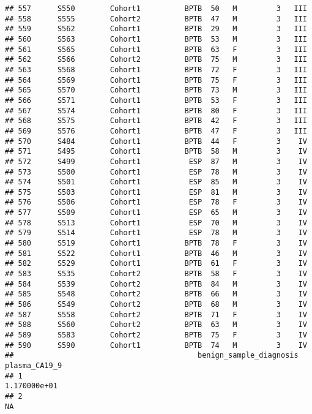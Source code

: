 \documentclass[
]{article}
\begin{document}
\begin{verbatim}
## 557      S550        Cohort1          BPTB  50   M         3   III
## 558      S555        Cohort2          BPTB  47   M         3   III
## 559      S562        Cohort1          BPTB  29   M         3   III
## 560      S563        Cohort1          BPTB  53   M         3   III
## 561      S565        Cohort1          BPTB  63   F         3   III
## 562      S566        Cohort2          BPTB  75   M         3   III
## 563      S568        Cohort1          BPTB  72   F         3   III
## 564      S569        Cohort1          BPTB  75   F         3   III
## 565      S570        Cohort1          BPTB  73   M         3   III
## 566      S571        Cohort1          BPTB  53   F         3   III
## 567      S574        Cohort1          BPTB  80   F         3   III
## 568      S575        Cohort1          BPTB  42   F         3   III
## 569      S576        Cohort1          BPTB  47   F         3   III
## 570      S484        Cohort1          BPTB  44   F         3    IV
## 571      S495        Cohort1          BPTB  58   M         3    IV
## 572      S499        Cohort1           ESP  87   M         3    IV
## 573      S500        Cohort1           ESP  78   M         3    IV
## 574      S501        Cohort1           ESP  85   M         3    IV
## 575      S503        Cohort1           ESP  81   M         3    IV
## 576      S506        Cohort1           ESP  78   F         3    IV
## 577      S509        Cohort1           ESP  65   M         3    IV
## 578      S513        Cohort1           ESP  70   M         3    IV
## 579      S514        Cohort1           ESP  78   M         3    IV
## 580      S519        Cohort1          BPTB  78   F         3    IV
## 581      S522        Cohort1          BPTB  46   M         3    IV
## 582      S529        Cohort1          BPTB  61   F         3    IV
## 583      S535        Cohort2          BPTB  58   F         3    IV
## 584      S539        Cohort2          BPTB  84   M         3    IV
## 585      S548        Cohort2          BPTB  66   M         3    IV
## 586      S549        Cohort2          BPTB  68   M         3    IV
## 587      S558        Cohort2          BPTB  71   F         3    IV
## 588      S560        Cohort2          BPTB  63   M         3    IV
## 589      S583        Cohort2          BPTB  75   F         3    IV
## 590      S590        Cohort1          BPTB  74   M         3    IV
##                                          benign_sample_diagnosis plasma_CA19_9
## 1                                                                 1.170000e+01
## 2                                                                           NA

\end{verbatim}
\end{document}
